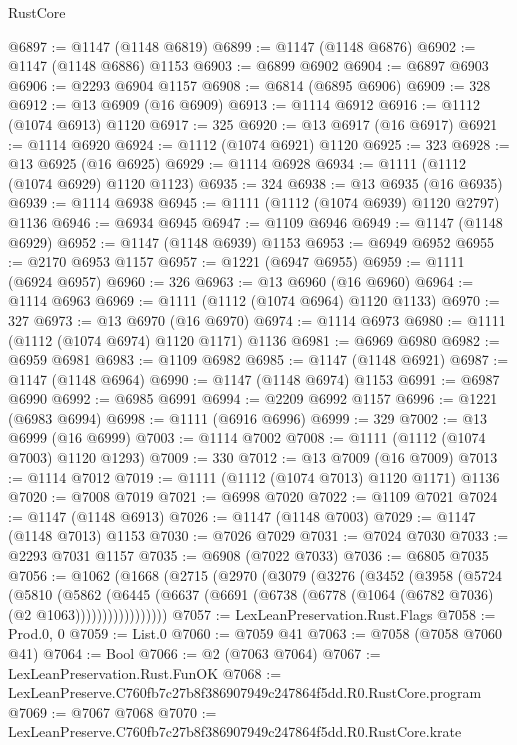 \begin{lexlean}{RustCore}
\begin{coremodule}
@6897 := @1147 (@1148 @6819)
@6899 := @1147 (@1148 @6876)
@6902 := @1147 (@1148 @6886) @1153
@6903 := @6899 @6902
@6904 := @6897 @6903
@6906 := @2293 @6904 @1157
@6908 := @6814 (@6895 @6906)
@6909 := 328
@6912 := @13 @6909 (@16 @6909)
@6913 := @1114 @6912
@6916 := @1112 (@1074 @6913) @1120
@6917 := 325
@6920 := @13 @6917 (@16 @6917)
@6921 := @1114 @6920
@6924 := @1112 (@1074 @6921) @1120
@6925 := 323
@6928 := @13 @6925 (@16 @6925)
@6929 := @1114 @6928
@6934 := @1111 (@1112 (@1074 @6929) @1120 @1123)
@6935 := 324
@6938 := @13 @6935 (@16 @6935)
@6939 := @1114 @6938
@6945 := @1111 (@1112 (@1074 @6939) @1120 @2797) @1136
@6946 := @6934 @6945
@6947 := @1109 @6946
@6949 := @1147 (@1148 @6929)
@6952 := @1147 (@1148 @6939) @1153
@6953 := @6949 @6952
@6955 := @2170 @6953 @1157
@6957 := @1221 (@6947 @6955)
@6959 := @1111 (@6924 @6957)
@6960 := 326
@6963 := @13 @6960 (@16 @6960)
@6964 := @1114 @6963
@6969 := @1111 (@1112 (@1074 @6964) @1120 @1133)
@6970 := 327
@6973 := @13 @6970 (@16 @6970)
@6974 := @1114 @6973
@6980 := @1111 (@1112 (@1074 @6974) @1120 @1171) @1136
@6981 := @6969 @6980
@6982 := @6959 @6981
@6983 := @1109 @6982
@6985 := @1147 (@1148 @6921)
@6987 := @1147 (@1148 @6964)
@6990 := @1147 (@1148 @6974) @1153
@6991 := @6987 @6990
@6992 := @6985 @6991
@6994 := @2209 @6992 @1157
@6996 := @1221 (@6983 @6994)
@6998 := @1111 (@6916 @6996)
@6999 := 329
@7002 := @13 @6999 (@16 @6999)
@7003 := @1114 @7002
@7008 := @1111 (@1112 (@1074 @7003) @1120 @1293)
@7009 := 330
@7012 := @13 @7009 (@16 @7009)
@7013 := @1114 @7012
@7019 := @1111 (@1112 (@1074 @7013) @1120 @1171) @1136
@7020 := @7008 @7019
@7021 := @6998 @7020
@7022 := @1109 @7021
@7024 := @1147 (@1148 @6913)
@7026 := @1147 (@1148 @7003)
@7029 := @1147 (@1148 @7013) @1153
@7030 := @7026 @7029
@7031 := @7024 @7030
@7033 := @2293 @7031 @1157
@7035 := @6908 (@7022 @7033)
@7036 := @6805 @7035
@7056 := @1062
    (@1668
      (@2715
        (@2970
          (@3079
            (@3276
              (@3452
                (@3958
                  (@5724
                    (@5810
                      (@5862
                        (@6445
                          (@6637
                            (@6691 (@6738 (@6778 (@1064 (@6782 @7036) (@2 @1063)))))))))))))))))
@7057 := LexLeanPreservation.Rust.Flags
@7058 := Prod.{0, 0}
@7059 := List.{0}
@7060 := @7059 @41
@7063 := @7058 (@7058 @7060 @41)
@7064 := Bool
@7066 := @2 (@7063 @7064)
@7067 := LexLeanPreservation.Rust.FunOK
@7068 := LexLeanPreserve.C760fb7c27b8f386907949c247864f5dd.R0.RustCore.program
@7069 := @7067 @7068
@7070 := LexLeanPreserve.C760fb7c27b8f386907949c247864f5dd.R0.RustCore.krate

\end{coremodule}
\end{lexlean}
